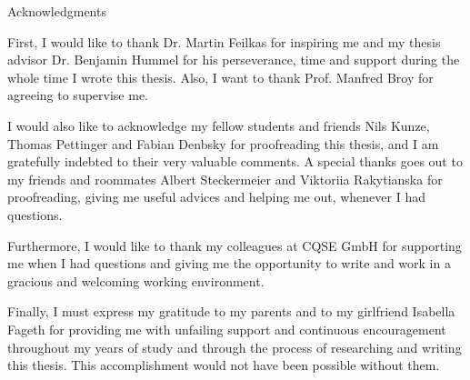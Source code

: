 \thispagestyle{empty}

\vspace*{20mm}

\begin{center}
{ Acknowledgments}
\end{center}

\vspace{10mm}
First, I would like to thank Dr. Martin Feilkas for inspiring me and my thesis advisor Dr. Benjamin Hummel for his perseverance, time and support during the whole time I wrote this thesis.
Also, I want to thank Prof. Manfred Broy for agreeing to supervise me.

I would also like to acknowledge my fellow students and friends Nils Kunze, Thomas Pettinger and Fabian Denbsky for proofreading this thesis, and I am gratefully indebted to their very valuable comments.
A special thanks goes out to my friends and roommates Albert Steckermeier and Viktoriia Rakytianska for proofreading, giving me useful advices and helping me out, whenever I had questions.

Furthermore, I would like to thank my colleagues at CQSE GmbH for supporting me when I had questions and giving me the opportunity to write and work in a gracious and welcoming working environment.

Finally, I must express my gratitude to my parents and to my girlfriend Isabella Fageth for providing me with unfailing support and continuous encouragement throughout my years of study and through the process of researching and writing this thesis.
This accomplishment would not have been possible without them.

\cleardoublepage{}
